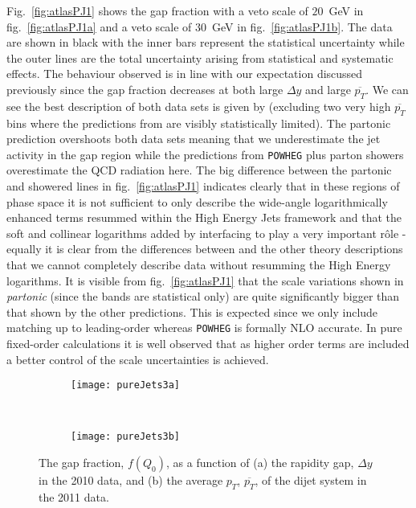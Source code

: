 	Fig.~\eqref{fig:atlasPJ1} shows the gap fraction with a veto scale of $20$~GeV in
	fig.~\eqref{fig:atlasPJ1a} and a veto scale of $30$~GeV in fig.~\eqref{fig:atlasPJ1b}.
	The data are shown in black with the inner bars represent the statistical uncertainty
	while the outer lines are the total uncertainty arising from statistical and systematic
	effects.  The behaviour observed is in line with our expectation discussed previously since the
	gap fraction decreases at both large $\Delta y$ and large $\overline{p_T}$.  We can see the
	best description of both data sets is given by \HEJA (excluding two very high $\overline{p_T}$
	bins where the predictions from \HEJA are visibly statistically limited). The partonic \HEJ
	prediction overshoots both data sets meaning that we underestimate the jet activity in the
	gap region while the predictions from \texttt{POWHEG} plus parton showers overestimate the
	QCD radiation here.  The big difference between the partonic and showered \HEJ lines in
	fig.~\eqref{fig:atlasPJ1} indicates clearly that in these regions of phase space it
	is not sufficient to only describe the wide-angle logarithmically enhanced terms resummed
	within the High Energy Jets framework and that the soft and collinear logarithms added by
	interfacing to \ARIADNE play a very important r\^ole - equally it is clear from the
	differences between \HEJ and the other theory descriptions that we cannot
	completely describe data without resumming the High Energy logarithms.  It is visible from
	fig.~\eqref{fig:atlasPJ1} that the scale variations shown in \emph{partonic} \HEJ (since the
	\HEJA bands are statistical only) are quite significantly bigger than that shown by the other
	predictions.  This is expected since we only include matching up to leading-order whereas
	\texttt{POWHEG} is formally NLO accurate.  In pure fixed-order calculations it is well
	observed that as higher order terms are included a better control of the scale uncertainties
	is achieved.

	\begin{figure}[bth]
		\centering
		\begin{subfigure}[b]{0.48\textwidth}
			\texttt{[image: pureJets3a]}
			\caption{}
			\label{fig:atlasPJ1a}
		\end{subfigure}
		~
		\begin{subfigure}[b]{0.48\textwidth}
			\texttt{[image: pureJets3b]}
			\caption{}
			\label{fig:atlasPJ1b}
		\end{subfigure}
		\caption{The gap fraction, $f(Q_0)$, as a function of (a) the rapidity gap,
		$\Delta y$ in the 2010 data, and (b) the average $p_T$, $\overline{p_T}$, of
		the dijet system in the 2011 data.}
		\label{fig:atlasPJ1}
	\end{figure}

